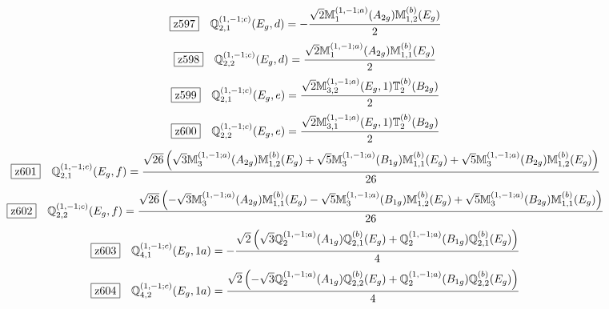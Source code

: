 \documentclass[fleqn,10pt,landscape]{jsarticle}
\begin{document}
\begin{dmath*}
\hspace*{3mm}\fbox{z597}\quad \mathbb{Q}_{2,1}^{(1,-1;c)}(E_{g},d)=- \frac{\sqrt{2} \mathbb{M}_{1}^{(1,-1;a)}(A_{2g}) \mathbb{M}_{1,2}^{(b)}(E_{g})}{2}
\end{dmath*}
\begin{dmath*}
\hspace*{3mm}\fbox{z598}\quad \mathbb{Q}_{2,2}^{(1,-1;c)}(E_{g},d)=\frac{\sqrt{2} \mathbb{M}_{1}^{(1,-1;a)}(A_{2g}) \mathbb{M}_{1,1}^{(b)}(E_{g})}{2}
\end{dmath*}
\begin{dmath*}
\hspace*{3mm}\fbox{z599}\quad \mathbb{Q}_{2,1}^{(1,-1;c)}(E_{g},e)=\frac{\sqrt{2} \mathbb{M}_{3,2}^{(1,-1;a)}(E_{g},1) \mathbb{T}_{2}^{(b)}(B_{2g})}{2}
\end{dmath*}
\begin{dmath*}
\hspace*{3mm}\fbox{z600}\quad \mathbb{Q}_{2,2}^{(1,-1;c)}(E_{g},e)=\frac{\sqrt{2} \mathbb{M}_{3,1}^{(1,-1;a)}(E_{g},1) \mathbb{T}_{2}^{(b)}(B_{2g})}{2}
\end{dmath*}
\begin{dmath*}
\hspace*{3mm}\fbox{z601}\quad \mathbb{Q}_{2,1}^{(1,-1;c)}(E_{g},f)=\frac{\sqrt{26} \left(\sqrt{3} \mathbb{M}_{3}^{(1,-1;a)}(A_{2g}) \mathbb{M}_{1,2}^{(b)}(E_{g}) + \sqrt{5} \mathbb{M}_{3}^{(1,-1;a)}(B_{1g}) \mathbb{M}_{1,1}^{(b)}(E_{g}) + \sqrt{5} \mathbb{M}_{3}^{(1,-1;a)}(B_{2g}) \mathbb{M}_{1,2}^{(b)}(E_{g})\right)}{26}
\end{dmath*}
\begin{dmath*}
\hspace*{3mm}\fbox{z602}\quad \mathbb{Q}_{2,2}^{(1,-1;c)}(E_{g},f)=\frac{\sqrt{26} \left(- \sqrt{3} \mathbb{M}_{3}^{(1,-1;a)}(A_{2g}) \mathbb{M}_{1,1}^{(b)}(E_{g}) - \sqrt{5} \mathbb{M}_{3}^{(1,-1;a)}(B_{1g}) \mathbb{M}_{1,2}^{(b)}(E_{g}) + \sqrt{5} \mathbb{M}_{3}^{(1,-1;a)}(B_{2g}) \mathbb{M}_{1,1}^{(b)}(E_{g})\right)}{26}
\end{dmath*}
\begin{dmath*}
\hspace*{3mm}\fbox{z603}\quad \mathbb{Q}_{4,1}^{(1,-1;c)}(E_{g},1a)=- \frac{\sqrt{2} \left(\sqrt{3} \mathbb{Q}_{2}^{(1,-1;a)}(A_{1g}) \mathbb{Q}_{2,1}^{(b)}(E_{g}) + \mathbb{Q}_{2}^{(1,-1;a)}(B_{1g}) \mathbb{Q}_{2,1}^{(b)}(E_{g})\right)}{4}
\end{dmath*}
\begin{dmath*}
\hspace*{3mm}\fbox{z604}\quad \mathbb{Q}_{4,2}^{(1,-1;c)}(E_{g},1a)=\frac{\sqrt{2} \left(- \sqrt{3} \mathbb{Q}_{2}^{(1,-1;a)}(A_{1g}) \mathbb{Q}_{2,2}^{(b)}(E_{g}) + \mathbb{Q}_{2}^{(1,-1;a)}(B_{1g}) \mathbb{Q}_{2,2}^{(b)}(E_{g})\right)}{4}
\end{dmath*}
\end{document}
